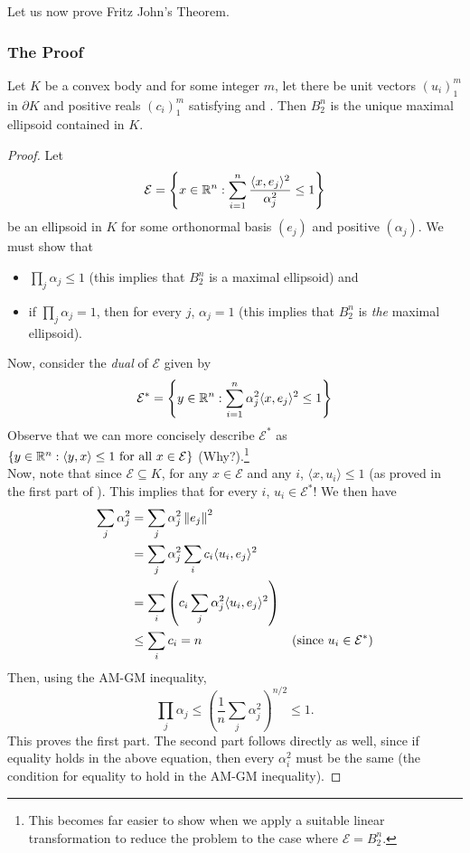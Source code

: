 Let us now prove Fritz John's Theorem.

\subsubsection{The Proof}

\begin{lemma}
\label{fritz johns theorem part 1}
Let $K$ be a convex body and for some integer $m$, let there be unit vectors $(u_i)_1^m$ in $\partial K$ and positive reals $(c_i)_1^m$ satisfying  and . Then $B_2^n$ is the unique maximal ellipsoid contained in $K$.
\end{lemma}
\begin{proof}
Let
\[ \mathcal{E} = \left\{x\in\mathbb{R}^n:\sum_{i=1}^n \frac{\langle x,e_j\rangle^2}{\alpha_j^2}\leq 1\right\} \]
be an ellipsoid in $K$ for some orthonormal basis $(e_j)$ and positive $(\alpha_j)$. We must show that
\begin{itemize}
    \item $\prod_j \alpha_j\leq 1$ (this implies that $B_2^n$ is a maximal ellipsoid) and
    \item if $\prod_j \alpha_j = 1$, then for every $j$, $\alpha_j = 1$ (this implies that $B_2^n$ is \textit{the} maximal ellipsoid).
\end{itemize}
Now, consider the \textit{dual} of $\mathcal{E}$ given by
\[ \mathcal{E}^* = \left\{y\in\mathbb{R}^n:\sum_{i=1}^n \alpha_j^2\langle x,e_j\rangle^2 \leq 1\right\} \]
Observe that we can more concisely describe $\mathcal{E}^*$ as $\{y\in\mathbb{R}^n:\langle y,x\rangle\leq 1\text{ for all }x\in\mathcal{E}\}$ (Why?).\footnote{This becomes far easier to show when we apply a suitable linear transformation to reduce the problem to the case where $\mathcal{E}=B_2^n$.}\\
Now, note that since $\mathcal{E}\subseteq K$, for any $x\in \mathcal{E}$ and any $i$, $\langle x,u_i\rangle\leq 1$ (as proved in the first part of ). This implies that for every $i$, $u_i\in\mathcal{E}^*$! We then have
\begin{align*}
    \sum_j \alpha_j^2 &= \sum_j \alpha_j^2 \left\lVert e_j\right\rVert^2 \\
    &= \sum_j \alpha_j^2 \sum_i c_i \langle u_i,e_j\rangle^2 \\
    &= \sum_i \left(c_i \sum_j \alpha_j^2\langle u_i,e_j\rangle^2 \right) \\
    &\leq \sum_i c_i = n & (\text{since }u_i\in\mathcal{E}^*)
\end{align*}
Then, using the AM-GM inequality,
\[ \prod_j \alpha_j \leq \left(\frac{1}{n}\sum_j \alpha_j^2\right)^{n/2} \leq 1. \]
This proves the first part. The second part follows directly as well, since if equality holds in the above equation, then every $\alpha_i^2$ must be the same (the condition for equality to hold in the AM-GM inequality).
\end{proof}

